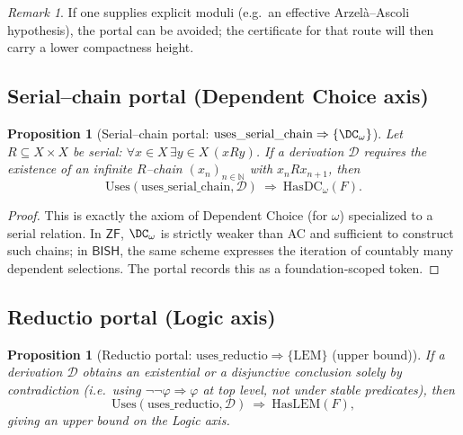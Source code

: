 \documentclass[11pt]{article}
\newtheorem{proposition}[theorem]{Proposition}
\theoremstyle{definition}
\theoremstyle{remark}
\newtheorem{remark}[theorem]{Remark}
\newcommand{\BISH}{\mathsf{BISH}}
\newcommand{\ZF}{\mathsf{ZF}}
\newcommand{\LEM}{\mathrm{LEM}}
\begin{document}
\begin{remark}
If one supplies explicit moduli (e.g.\ an effective Arzelà–Ascoli hypothesis), the portal can be avoided; the certificate for that route will then carry a lower compactness height.
\end{remark}

\subsection{Serial–chain portal (Dependent Choice axis)}

\begin{proposition}[Serial–chain portal: $\mathrm{uses\_serial\_chain}\Rightarrow\{\DC_\omega\}$]
\label{prop:dc-portal}
Let $R\subseteq X\times X$ be serial: $\forall x\in X\,\exists y\in X\,(xRy)$. If a derivation $\mathcal{D}$ requires the existence of an infinite $R$–chain $(x_n)_{n\in\mathbb{N}}$ with $x_n R x_{n+1}$, then
\[
\mathrm{Uses}(\mathrm{uses\_serial\_chain},\mathcal{D})\ \Rightarrow\ \mathrm{HasDC}_\omega(F).
\]
\end{proposition}

\begin{proof}
This is exactly the axiom of Dependent Choice (for $\omega$) specialized to a serial relation. In $\ZF$, $\DC_\omega$ is strictly weaker than AC and sufficient to construct such chains; in $\BISH$, the same scheme expresses the iteration of countably many dependent selections. The portal records this as a foundation‑scoped token. \qedhere
\end{proof}

\subsection{Reductio portal (Logic axis)}

\begin{proposition}[Reductio portal: $\mathrm{uses\_reductio}\Rightarrow\{\LEM\}$ (upper bound)]
\label{prop:reductio-portal}
If a derivation $\mathcal{D}$ obtains an \emph{existential} or a \emph{disjunctive} conclusion solely by contradiction (i.e.\ using $\neg\neg\varphi\Rightarrow\varphi$ at top level, not under stable predicates), then
\[
\mathrm{Uses}(\mathrm{uses\_reductio},\mathcal{D})\ \Rightarrow\ \mathrm{HasLEM}(F),
\]
giving an upper bound on the Logic axis.
\end{proposition}
\end{document}
